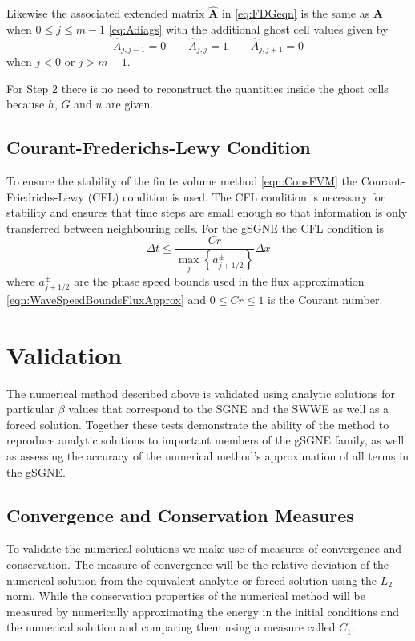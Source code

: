 \documentclass[10pt]{elsarticle}
\newcommand{\vecn}[1]{\boldsymbol{#1}}
\begin{document}
Likewise the associated extended matrix $\vecn{\hat{A}}$ in \eqref{eq:FDGeqn} is the same as $\vecn{A}$ when $0 \le j \le m -1$  \eqref{eq:Adiags} with the additional ghost cell values given by
\begin{equation*}
\hat{A}_{j,j-1} =  0  \quad \quad
\hat{A}_{j,j} = 1 \quad \quad
\hat{A}_{j,j+1} = 0
\end{equation*}
when $j < 0$ or $j > m -1$. 

For Step 2 there is no need to reconstruct the quantities inside the ghost cells because $h$, $G$ and $u$ are given. 


\subsection{Courant-Frederichs-Lewy Condition}
To ensure the stability of the finite volume method \eqref{eqn:ConsFVM} the Courant-Friedrichs-Lewy (CFL) condition \cite{Courant-etal-1967-215} is used. The CFL condition is necessary for stability and ensures that time steps are small enough so that information is only transferred between neighbouring cells. For the gSGNE the CFL condition is 
\begin{equation}
\Delta t \le \frac{Cr }{\max_{j} \left\lbrace a^\pm_{j+1/2} \right\rbrace} \Delta x
\label{eqn:CFLcond}
\end{equation}
where $a^\pm_{j+1/2} $ are the phase speed bounds used in the flux approximation \eqref{eqn:WaveSpeedBoundsFluxApprox} and $0\le Cr \le 1$ is the Courant number. 

\section{Validation}
The numerical method described above is validated using analytic solutions for particular $\beta$ values that correspond to the SGNE and the SWWE as well as a forced solution. Together these tests demonstrate the ability of the method to reproduce analytic solutions to important members of the gSGNE family, as well as assessing the accuracy of the numerical method's approximation of all terms in the gSGNE.

\subsection{Convergence and Conservation Measures}
To validate the numerical solutions we make use of measures of convergence and conservation. The measure of convergence will be the relative deviation of the numerical solution from the equivalent analytic or forced solution using the $L_2$ norm. While the conservation properties of the numerical method will be measured by numerically approximating the energy in the initial conditions and the numerical solution and comparing them using a measure called $C_1$.
\end{document}
